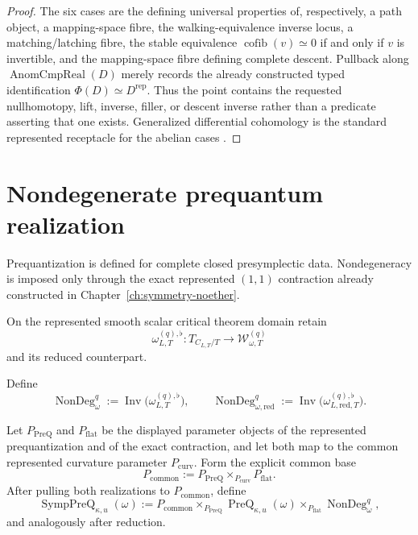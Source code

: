 \begin{proof}
The six cases are the defining universal properties of, respectively, a path
object, a mapping-space fibre, the walking-equivalence inverse locus, a
matching/latching fibre, the stable equivalence
$\operatorname{cofib}(v)\simeq0$ if and only if $v$ is invertible, and the
mapping-space fibre defining complete descent.  Pullback along
$\operatorname{AnomCmpReal}(D)$ merely records the already constructed typed
identification $\Phi(D)\simeq D^{\mathrm{rep}}$.  Thus the point contains the
requested nullhomotopy, lift, inverse, filler, or descent inverse rather than a
predicate asserting that one exists.  Generalized differential cohomology is the
standard represented receptacle for the abelian cases \cite{Freed2000}.
\end{proof}

\section{Nondegenerate prequantum realization}
\label{sec:prequantum-nondegenerate-realization}

Prequantization is defined for complete closed presymplectic data.  Nondegeneracy
is imposed only through the exact represented $(1,1)$ contraction already
constructed in Chapter~\ref{ch:symmetry-noether}.

On the represented smooth scalar critical theorem domain retain
\[
\omega_{L,T}^{(q),\flat}:
T_{C_{L,T}/T}
\longrightarrow
\mathcal W_{\omega,T}^{(q)}
\]
and its reduced counterpart.

\begin{definition}
\label{def:prequantum-nondegeneracy-realization}
Define
\[
\operatorname{NonDeg}_{\omega}^{q}
:=
\operatorname{Inv}
\bigl(\omega_{L,T}^{(q),\flat}\bigr),
\qquad
\operatorname{NonDeg}_{\omega,\mathrm{red}}^{q}
:=
\operatorname{Inv}
\bigl(\omega_{L,\mathrm{red},T}^{(q),\flat}\bigr).
\]
\end{definition}

\begin{definition}
\label{def:prequantum-nondegenerate-prequantization}
Let $P_{\mathrm{PreQ}}$ and $P_{\mathrm{flat}}$ be the displayed parameter
objects of the represented prequantization and of the exact contraction, and
let both map to the common represented curvature parameter $P_{\mathrm{curv}}$.
Form the explicit common base
\[
P_{\mathrm{common}}
:=
P_{\mathrm{PreQ}}\times_{P_{\mathrm{curv}}}P_{\mathrm{flat}}.
\]
After pulling both realizations to $P_{\mathrm{common}}$, define
\[
\boxed{
\operatorname{SympPreQ}_{\kappa,u}(\omega)
:=
P_{\mathrm{common}}
\times_{P_{\mathrm{PreQ}}}
\operatorname{PreQ}_{\kappa,u}(\omega)
\times_{P_{\mathrm{flat}}}
\operatorname{NonDeg}_{\omega}^{q},
}
\]
and analogously after reduction.
\end{definition}

